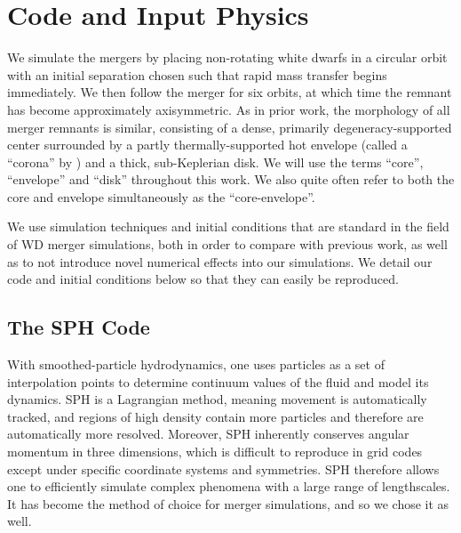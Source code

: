 \section{Code and Input Physics}
\label{sec:c2_gasoline}

We simulate the mergers by placing non-rotating white dwarfs in a circular orbit with an initial separation {\azero} chosen such that rapid mass transfer begins immediately.  We then follow the merger for six orbits, at which time the remnant has become approximately axisymmetric.  As in prior work, the morphology of all merger remnants is similar, consisting of a dense, primarily degeneracy-supported center surrounded by a partly thermally-supported hot envelope (called a ``corona'' by \citeal{loreig09}) and a thick, sub-Keplerian disk.  We will use the terms ``core'', ``envelope'' and ``disk'' throughout this work.  We also quite often refer to both the core and envelope simultaneously as the ``core-envelope''.

We use simulation techniques and initial conditions that are standard in the field of WD merger simulations, both in order to compare with previous work, as well as to not introduce novel numerical effects into our simulations.  We detail our code and initial conditions below so that they can easily be reproduced.

\subsection{The SPH Code}
\label{ssec:c2_sphcode}

With smoothed-particle hydrodynamics, one uses particles as a set of interpolation points to determine continuum values of the fluid and model its dynamics.  SPH is a Lagrangian method, meaning movement is automatically tracked, and regions of high density contain more particles and therefore are automatically more resolved.  Moreover, SPH inherently conserves angular momentum in three dimensions, which is difficult to reproduce in grid codes except under specific coordinate systems and symmetries.  SPH therefore allows one to efficiently simulate complex phenomena with a large range of lengthscales.  It has become the method of choice for merger simulations, and so we chose it as well.



